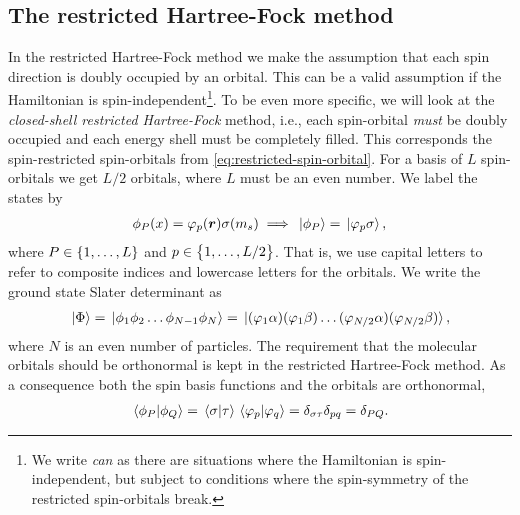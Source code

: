         \subsection{The restricted Hartree-Fock method}
            \label{subsec:rhf}
            In the restricted Hartree-Fock method we make the assumption that
            each spin direction is doubly occupied by an orbital.
            This can be a valid assumption if the Hamiltonian is
            spin-independent\footnote{%
                We write \emph{can} as there are situations where the
                Hamiltonian is spin-independent, but subject to conditions where
                the spin-symmetry of the restricted spin-orbitals break.
            }.
            To be even more specific, we will look at the \emph{closed-shell
            restricted Hartree-Fock} method, i.e., each spin-orbital \emph{must}
            be doubly occupied and each energy shell must be completely filled.
            This corresponds the spin-restricted spin-orbitals from
            \autoref{eq:restricted-spin-orbital}.
            For a basis of $L$ spin-orbitals we get $L/2$ orbitals, where $L$
            must be an even number.
            We label the states by
            \begin{align}
                \phi_{P}(x) = \varphi_p(\boldsymbol{r}) \sigma(m_s)
                \implies
                \ket*{\phi_P} = \ket*{\varphi_p\sigma},
            \end{align}
            where $P \in \left\{ 1, \dots, L \right\}$ and $p \in \left\{ 1, \dots, L / 2 \right\}$.
            That is, we use capital letters to refer to composite indices and
            lowercase letters for the orbitals.
            We write the ground state Slater determinant as
            \begin{align}
                \ket*{\Phi} = \ket*{\phi_1 \phi_2 \dots \phi_{N - 1} \phi_N}
                = \ket*{
                    (\varphi_1 \alpha)
                    (\varphi_1 \beta)
                    \dots
                    (\varphi_{N / 2} \alpha)
                    (\varphi_{N / 2}\beta)
                },
            \end{align}
            where $N$ is an even number of particles.
            The requirement that the molecular orbitals should be orthonormal is
            kept in the restricted Hartree-Fock method.
            As a consequence both the spin basis functions and the orbitals are
            orthonormal,
            \begin{align}
                \braket*{\phi_P}{\phi_Q}
                = \braket*{\sigma}{\tau}
                \braket*{\varphi_p}{\varphi_q}
                = \delta_{\sigma \tau}
                \delta_{pq}
                = \delta_{PQ}.
            \end{align}
